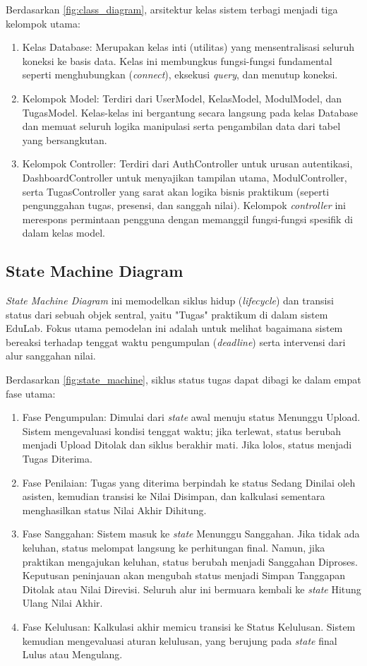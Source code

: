 \documentclass[12pt,a4paper,twoside]{report}
\begin{document}
Berdasarkan \autoref{fig:class_diagram}, arsitektur kelas sistem terbagi menjadi tiga kelompok utama:
\begin{enumerate}[nosep]
    \item Kelas Database: Merupakan kelas inti (utilitas) yang mensentralisasi seluruh koneksi ke basis data. Kelas ini membungkus fungsi-fungsi fundamental seperti menghubungkan (\textit{connect}), eksekusi \textit{query}, dan menutup koneksi.
    \item Kelompok Model: Terdiri dari UserModel, KelasModel, ModulModel, dan TugasModel. Kelas-kelas ini bergantung secara langsung pada kelas Database dan memuat seluruh logika manipulasi serta pengambilan data dari tabel yang bersangkutan.
    \item Kelompok Controller: Terdiri dari AuthController untuk urusan autentikasi, DashboardController untuk menyajikan tampilan utama, ModulController, serta TugasController yang sarat akan logika bisnis praktikum (seperti pengunggahan tugas, presensi, dan sanggah nilai). Kelompok \textit{controller} ini merespons permintaan pengguna dengan memanggil fungsi-fungsi spesifik di dalam kelas model.
\end{enumerate}
\subsection{State Machine Diagram}

\textit{State Machine Diagram} ini memodelkan siklus hidup (\textit{lifecycle}) dan transisi status dari sebuah objek sentral, yaitu "Tugas" praktikum di dalam sistem EduLab. Fokus utama pemodelan ini adalah untuk melihat bagaimana sistem bereaksi terhadap tenggat waktu pengumpulan (\textit{deadline}) serta intervensi dari alur sanggahan nilai.

Berdasarkan \autoref{fig:state_machine}, siklus status tugas dapat dibagi ke dalam empat fase utama:
\begin{enumerate}[nosep]
    \item Fase Pengumpulan: Dimulai dari \textit{state} awal menuju status Menunggu Upload. Sistem mengevaluasi kondisi tenggat waktu; jika terlewat, status berubah menjadi Upload Ditolak dan siklus berakhir mati. Jika lolos, status menjadi Tugas Diterima.
    \item Fase Penilaian: Tugas yang diterima berpindah ke status Sedang Dinilai oleh asisten, kemudian transisi ke Nilai Disimpan, dan kalkulasi sementara menghasilkan status Nilai Akhir Dihitung.
    \item Fase Sanggahan: Sistem masuk ke \textit{state} Menunggu Sanggahan. Jika tidak ada keluhan, status melompat langsung ke perhitungan final. Namun, jika praktikan mengajukan keluhan, status berubah menjadi Sanggahan Diproses. Keputusan peninjauan akan mengubah status menjadi Simpan Tanggapan Ditolak atau Nilai Direvisi. Seluruh alur ini bermuara kembali ke \textit{state} Hitung Ulang Nilai Akhir.
    \item Fase Kelulusan: Kalkulasi akhir memicu transisi ke Status Kelulusan. Sistem kemudian mengevaluasi aturan kelulusan, yang berujung pada \textit{state} final Lulus atau Mengulang.
\end{enumerate}
\end{document}
